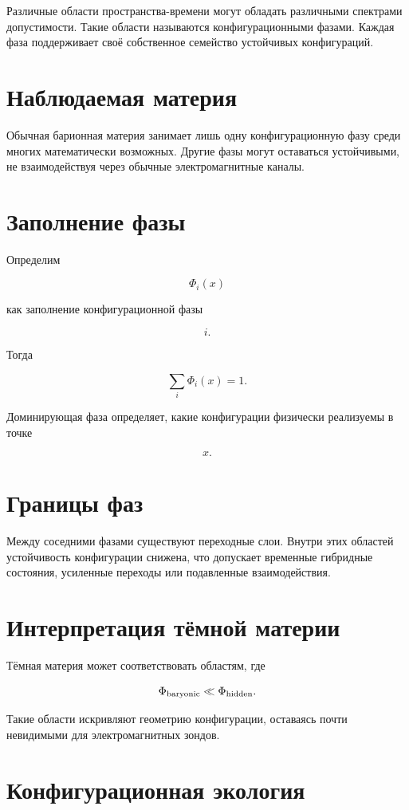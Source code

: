 Различные области пространства-времени могут обладать различными спектрами допустимости. Такие области называются конфигурационными фазами. Каждая фаза поддерживает своё собственное семейство устойчивых конфигураций.

\section{Наблюдаемая материя}

Обычная барионная материя занимает лишь одну конфигурационную фазу среди многих математически возможных. Другие фазы могут оставаться устойчивыми, не взаимодействуя через обычные электромагнитные каналы.

\section{Заполнение фазы}

Определим

\[ \Phi_i(x) \]

как заполнение конфигурационной фазы

\[ i. \]

Тогда

\[ \sum_i \Phi_i(x)=1. \]

Доминирующая фаза определяет, какие конфигурации физически реализуемы в точке

\[ x. \]

\section{Границы фаз}

Между соседними фазами существуют переходные слои. Внутри этих областей устойчивость конфигурации снижена, что допускает временные гибридные состояния, усиленные переходы или подавленные взаимодействия.

\section{Интерпретация тёмной материи}

Тёмная материя может соответствовать областям, где

\[ \Phi_{\rm baryonic} \ll \Phi_{\rm hidden}. \]

Такие области искривляют геометрию конфигурации, оставаясь почти невидимыми для электромагнитных зондов.

\section{Конфигурационная экология}

